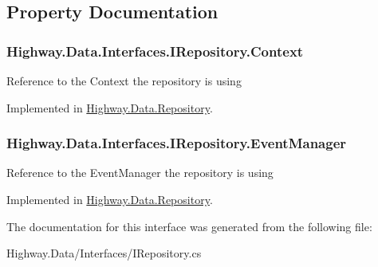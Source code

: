 \subsection{Property Documentation}
\hypertarget{interface_highway_1_1_data_1_1_interfaces_1_1_i_repository_aadf2e3d1d5b118f2fe6e2b1fc1ae8e77}{
\subsubsection[{Context}]{ Highway.\-Data.\-Interfaces.\-I\-Repository.\-Context\hspace{0.3cm}{\ttfamily [get]}}}\label{interface_highway_1_1_data_1_1_interfaces_1_1_i_repository_aadf2e3d1d5b118f2fe6e2b1fc1ae8e77}


Reference to the Context the repository is using 



Implemented in \hyperlink{class_highway_1_1_data_1_1_repository_a56e71ca922bdbd73db6986b3609e5ed7}{Highway.\-Data.\-Repository}.

\hypertarget{interface_highway_1_1_data_1_1_interfaces_1_1_i_repository_a2f76cda20f7e51ce44c11a077194c747}{
\subsubsection[{Event\-Manager}]{ Highway.\-Data.\-Interfaces.\-I\-Repository.\-Event\-Manager\hspace{0.3cm}{\ttfamily [get]}}}\label{interface_highway_1_1_data_1_1_interfaces_1_1_i_repository_a2f76cda20f7e51ce44c11a077194c747}


Reference to the Event\-Manager the repository is using 



Implemented in \hyperlink{class_highway_1_1_data_1_1_repository_ac1ac32fc8d217cfb1d47bb1cc68088c6}{Highway.\-Data.\-Repository}.



The documentation for this interface was generated from the following file\-:\begin{DoxyCompactItemize}
\item 
Highway.\-Data/\-Interfaces/I\-Repository.\-cs\end{DoxyCompactItemize}
